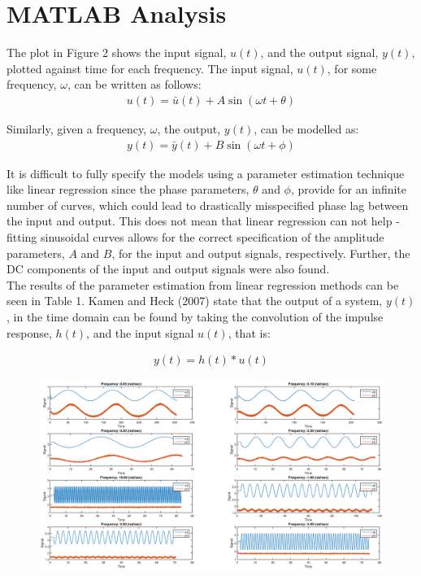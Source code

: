 \documentclass{article}
\begin{document}

\section{MATLAB Analysis}

The plot in Figure 2 shows the input signal, $u(t)$, and the output signal, $y(t)$, plotted against time for each frequency. The input signal, $u(t)$, for some frequency, $\omega$, can be written as follows:
\begin{align*}
	u(t) = \bar{u}(t) + A \sin(\omega t + \theta)
\end{align*}

Similarly, given a frequency, $\omega$, the output, $y(t)$, can be modelled as:
\begin{align*}
	y(t) = \bar{y}(t) + B \sin(\omega t + \phi)
\end{align*}

It is difficult to fully specify the models using a parameter estimation technique like linear regression since the phase parameters, $\theta$ and $\phi$, provide for an infinite number of curves, which could lead to drastically misspecified phase lag between the input and output. This does not mean that linear regression can not help - fitting sinusoidal curves allows for the correct specification of the amplitude parameters, $A$ and $B$, for the input and output signals, respectively. Further, the DC components of the input and output signals were also found.\\

The results of the parameter estimation from linear regression methods can be seen in Table 1. Kamen and Heck (2007) state that the output of a system, $y(t)$, in the time domain can be found by taking the convolution of the impulse response, $h(t)$, and the input signal $u(t)$, that is:

\begin{align}
	y(t) = h(t)*u(t)
\end{align}

\begin{figure}[H]
	\hspace*{-4.2cm}
	\centering
	\includegraphics[scale=0.4]{fig1.eps}
\end{figure}
\end{document}
